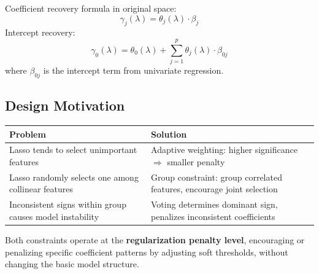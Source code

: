 \documentclass{article}
\begin{document}
Coefficient recovery formula in original space:
\[
\boxed{
\gamma_j(\lambda) = \theta_j(\lambda) \cdot \beta_j
}
\]
Intercept recovery:
\[
\boxed{
\gamma_0(\lambda) = \theta_0(\lambda) + \sum_{j=1}^p \theta_j(\lambda) \cdot \beta_{0j}
}
\]
where $\beta_{0j}$ is the intercept term from univariate regression.

\subsection{Design Motivation}

\begin{center}
\begin{tabular}{ll}
\hline
Problem & Solution \\
\hline
Lasso tends to select unimportant features & Adaptive weighting: higher significance $\Rightarrow$ smaller penalty \\
Lasso randomly selects one among collinear features & Group constraint: group correlated features, encourage joint selection \\
Inconsistent signs within group causes model instability & Voting determines dominant sign, penalizes inconsistent coefficients \\
\hline
\end{tabular}
\end{center}

Both constraints operate at the \textbf{regularization penalty level}, encouraging or penalizing specific coefficient patterns by adjusting soft thresholds, without changing the basic model structure.
\end{document}

